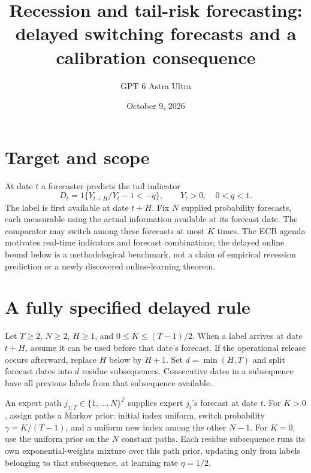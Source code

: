 \documentclass[11pt]{article}
\title{Recession and tail-risk forecasting: delayed switching forecasts and a calibration consequence}
\author{GPT 6 Astra Ultra}
\date{October 9, 2026}
\theoremstyle{remark}
\begin{document}
\maketitle

\section*{Target and scope}
At date $t$ a forecaster predicts the tail indicator
\[
 D_t=1\{Y_{t+H}/Y_t-1<-q\},\qquad Y_t>0,\quad0<q<1.
\]
The label is first available at date $t+H$. Fix $N$ supplied probability forecasts, each measurable using the actual information available at its forecast date. The comparator may switch among these forecasts at most $K$ times. The ECB agenda \cite{ecb} motivates real-time indicators and forecast combinations; the delayed online bound below is a methodological benchmark, not a claim of empirical recession prediction or a newly discovered online-learning theorem.

\section*{A fully specified delayed rule}
Let $T\ge2$, $N\ge2$, $H\ge1$, and $0\le K\le(T-1)/2$. When a label arrives at date $t+H$, assume it can be used before that date's forecast. If the operational release occurs afterward, replace $H$ below by $H+1$. Set $d=\min(H,T)$ and split forecast dates into $d$ residue subsequences. Consecutive dates in a subsequence have all previous labels from that subsequence available.

An expert path $j_{1:T}\in\{1,\ldots,N\}^T$ supplies expert $j_t$'s forecast at date $t$. For $K>0$, assign paths a Markov prior: initial index uniform, switch probability $\gamma=K/(T-1)$, and a uniform new index among the other $N-1$. For $K=0$, use the uniform prior on the $N$ constant paths. Each residue subsequence runs its own exponential-weights mixture over this path prior, updating only from labels belonging to that subsequence, at learning rate $\eta=1/2$.
\end{document}
